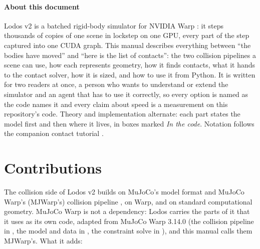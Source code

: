 



\paragraph{About this document}
Lodos v2 is a batched rigid-body simulator for NVIDIA Warp \cite{warp}: it steps thousands of copies of one scene in lockstep on one GPU, every part of the step captured into one CUDA graph. This manual describes everything between ``the bodies have moved'' and ``here is the list of contacts'': the two collision pipelines a scene can use, how each represents geometry, how it finds contacts, what it hands to the contact solver, how it is sized, and how to use it from Python. It is written for two readers at once, a person who wants to understand or extend the simulator and an agent that has to use it correctly, so every option is named as the code names it and every claim about speed is a measurement on this repository's code. Theory and implementation alternate: each part states the model first and then where it lives, in boxes marked \emph{In the code}. Notation follows the companion contact tutorial \cite{tutorial}.

\setcounter{tocdepth}{2}
\tableofcontents

\section{Contributions}\label{sec:contributions}

The collision side of Lodos v2 builds on MuJoCo's model format and MuJoCo Warp's (MJWarp's) collision pipeline \cite{mujoco,mjwarp}, on Warp, and on standard computational geometry. MuJoCo Warp is not a dependency: Lodos carries the parts of it that it uses as its own code, adapted from MuJoCo Warp 3.14.0 (the collision pipeline in , the model and data in , the constraint solve in ), and this manual calls them MJWarp's. What it adds:

